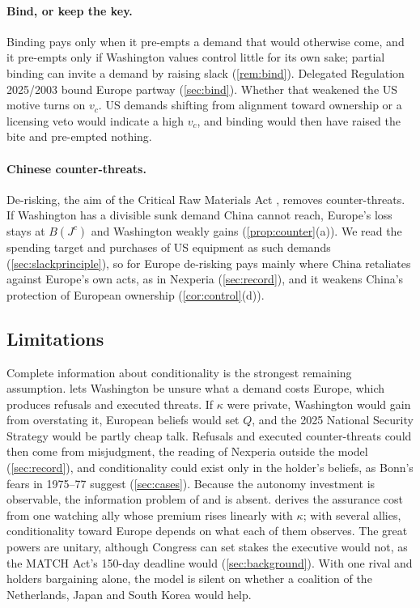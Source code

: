 \paragraph{Bind, or keep the key.} Binding pays only when it pre-empts a demand that would otherwise come, and it pre-empts only if Washington values control little for its own sake; partial binding can invite a demand by raising slack (\cref{rem:bind}). Delegated Regulation 2025/2003 \citep{eu2025dualuse} bound Europe partway (\cref{sec:bind}). Whether that weakened the US motive turns on $v_c$. US demands shifting from alignment toward ownership or a licensing veto would indicate a high $v_c$, and binding would then have raised the bite and pre-empted nothing.

\paragraph{Chinese counter-threats.} De-risking, the aim of the Critical Raw Materials Act \citep{eu2024crma}, removes counter-threats. If Washington has a divisible sunk demand China cannot reach, Europe's loss stays at $B(J^c)$ and Washington weakly gains (\cref{prop:counter}(a)). We read the spending target and purchases of US equipment as such demands (\cref{sec:slackprinciple}), so for Europe de-risking pays mainly where China retaliates against Europe's own acts, as in Nexperia (\cref{sec:record}), and it weakens China's protection of European ownership (\cref{cor:control}(d)).

\subsection{Limitations}\label{sec:limits}

Complete information about conditionality is the strongest remaining assumption.  lets Washington be unsure what a demand costs Europe, which produces refusals and executed threats. If $\kappa$ were private, Washington would gain from overstating it, European beliefs would set $Q$, and the 2025 National Security Strategy would be partly cheap talk. Refusals and executed counter-threats could then come from misjudgment, the reading of Nexperia outside the model (\cref{sec:record}), and conditionality could exist only in the holder's beliefs, as Bonn's fears in 1975--77 suggest (\cref{sec:cases}). Because the autonomy investment is observable, the information problem of \citet{debs2014known} and \citet{bas2016dynamic} is absent.  derives the assurance cost from one watching ally whose premium rises linearly with $\kappa$; with several allies, conditionality toward Europe depends on what each of them observes. The great powers are unitary, although Congress can set stakes the executive would not, as the MATCH Act's 150-day deadline would (\cref{sec:background}). With one rival and holders bargaining alone, the model is silent on whether a coalition of the Netherlands, Japan and South Korea would help.

